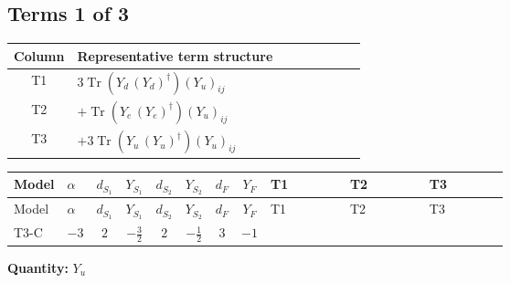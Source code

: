 \documentclass[8pt]{article}
\begin{document}
\begin{landscape}
\subsection*{Terms 1 of 3}
\begin{center}
\begin{tabular}{@{}c >{\raggedright\arraybackslash}p{0.82\linewidth}@{}}
\toprule
Column & Representative term structure \\
\midrule
T1 & \(\displaystyle 3 \operatorname{Tr}\!\left({Y_d}\,\left({Y_d}\right)^{\dagger}\right) \left({Y_u}\right)_{ij}\) \\
\midrule
T2 & \(\displaystyle +\operatorname{Tr}\!\left({Y_e}\,\left({Y_e}\right)^{\dagger}\right) \left({Y_u}\right)_{ij}\) \\
\midrule
T3 & \(\displaystyle +3 \operatorname{Tr}\!\left({Y_u}\,\left({Y_u}\right)^{\dagger}\right) \left({Y_u}\right)_{ij}\) \\
\midrule
\bottomrule
\end{tabular}
\end{center}
\smallskip
\tiny
\begin{longtable}{@{}llcccccc >{\raggedright\arraybackslash}p{0.21\linewidth} >{\raggedright\arraybackslash}p{0.21\linewidth} >{\raggedright\arraybackslash}p{0.21\linewidth}@{}}
\toprule
Model & $\alpha$ & $d_{S_1}$ & $Y_{S_1}$ & $d_{S_2}$ & $Y_{S_2}$ & $d_F$ & $Y_F$ & T1 & T2 & T3 \\
\midrule
\endfirsthead
\toprule
Model & $\alpha$ & $d_{S_1}$ & $Y_{S_1}$ & $d_{S_2}$ & $Y_{S_2}$ & $d_F$ & $Y_F$ & T1 & T2 & T3 \\
\midrule
\endhead
T3-C & $-3$ & $2$ & $-\frac{3}{2}$ & $2$ & $-\frac{1}{2}$ & $3$ & $-1$ & \scriptsize\adjustbox{max width=\linewidth}{$\begin{gathered} 3 \operatorname{Tr}\!\left({Y_d}\,\left({Y_d}\right)^{\dagger}\right) \left({Y_u}\right)_{ij}\end{gathered}$} & \scriptsize\adjustbox{max width=\linewidth}{$\begin{gathered} +\operatorname{Tr}\!\left({Y_e}\,\left({Y_e}\right)^{\dagger}\right) \left({Y_u}\right)_{ij}\end{gathered}$} & \scriptsize\adjustbox{max width=\linewidth}{$\begin{gathered} +3 \operatorname{Tr}\!\left({Y_u}\,\left({Y_u}\right)^{\dagger}\right) \left({Y_u}\right)_{ij}\end{gathered}$} \\
\midrule
\bottomrule
\end{longtable}
\clearpage
\noindent\textbf{Quantity: }$Y_u$\par\smallskip

\end{landscape}
\end{document}
